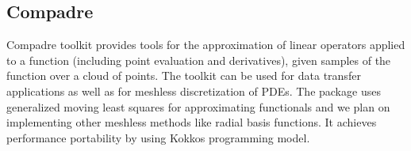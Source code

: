 \subsection{Compadre}
Compadre toolkit provides tools for the approximation of linear operators applied to a function (including point evaluation and derivatives), given samples of the function over a cloud of points. The toolkit can be used for data transfer applications as well as for meshless discretization of PDEs. The package uses generalized moving least squares for approximating functionals and we plan on implementing other meshless methods like radial basis functions. It achieves performance portability by using Kokkos programming model.


